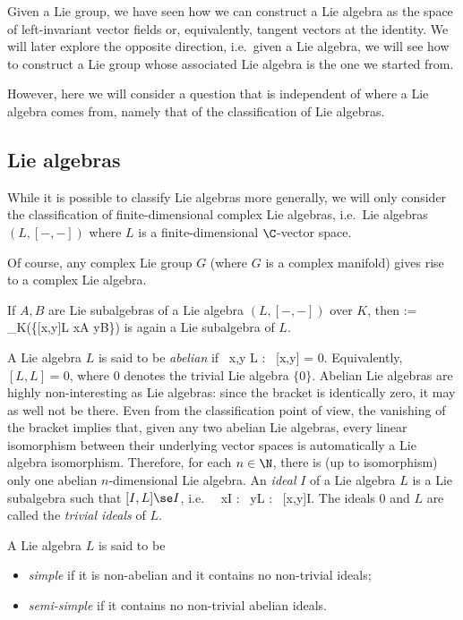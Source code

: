 

Given a Lie group, we have seen how we can construct a Lie algebra as the space of left-invariant vector fields or, equivalently, tangent vectors at the identity. We will later explore the opposite direction, i.e.\ given a Lie algebra, we will see how to construct a Lie group whose associated Lie algebra is the one we started from. 

However, here we will consider a question that is independent of where a Lie algebra comes from, namely that of the classification of Lie algebras.

\subsection{Lie algebras}

While it is possible to classify Lie algebras more generally, we will only consider the classification of finite-dimensional complex Lie algebras, i.e.\ Lie algebras $(L,[-,-])$ where $L$ is a finite-dimensional $\C$-vector space. 

\be
Of course, any complex Lie group $G$ (where $G$ is a complex manifold) gives rise to a complex Lie algebra.
\ee

If $A,B$ are Lie subalgebras of a Lie algebra $(L,[-,-])$ over $K$, then
\bse
[A,B] := \lspan_K\bigl(\{[x,y]\in L \mid x\in A  y\in B\}\bigr)
\ese
is again a Lie subalgebra of $L$.

\bd
A Lie algebra $L$ is said to be \emph{abelian} if
\bse
\forall \, x,y \in L : \ [x,y] = 0.
\ese
Equivalently, $[L,L]=0$, where $0$ denotes the trivial Lie algebra $\{0\}$.
\ed
Abelian Lie algebras are highly non-interesting as Lie algebras: since the bracket is identically zero, it may as well not be there. Even from the classification point of view, the vanishing of the bracket implies that, given any two abelian Lie algebras, every linear isomorphism between their underlying vector spaces is automatically a Lie algebra isomorphism. Therefore, for each $n\in \N$, there is (up to isomorphism) only one abelian $n$-dimensional Lie algebra.
\bd
An \emph{ideal} $I$ of a Lie algebra $L$ is a Lie subalgebra such that $[I,L]\se I$, i.e.\
\bse
\forall \, x\in I : \forall \, y\in L : \ [x,y]\in I.
\ese
The ideals $0$ and $L$ are called the \emph{trivial ideals} of $L$.
\ed

\bd
A Lie algebra $L$ is said to be 
\begin{itemize}
\item \emph{simple} if it is non-abelian and it contains no non-trivial ideals;
\item \emph{semi-simple} if it contains no non-trivial abelian ideals.
\end{itemize}
\ed

